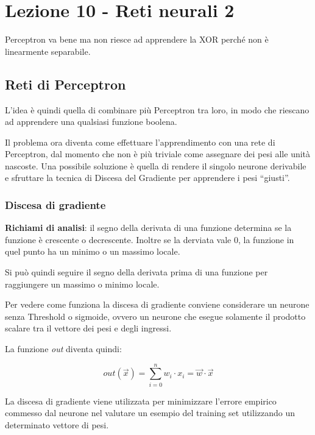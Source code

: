 \section{Lezione 10 - Reti neurali 2}\label{lezione-10---reti-neurali-2}

Perceptron va bene ma non riesce ad apprendere la XOR perché non è
linearmente separabile.

\subsection{Reti di Perceptron}\label{reti-di-perceptron}

L'idea è quindi quella di combinare più Perceptron tra loro, in modo che
riescano ad apprendere una qualsiasi funzione boolena.

Il problema ora diventa come effettuare l'apprendimento con una rete di
Perceptron, dal momento che non è più triviale come assegnare dei pesi
alle unità nascoste. Una possibile soluzione è quella di rendere il
singolo neurone derivabile e sfruttare la tecnica di Discesa del
Gradiente per apprendere i pesi ``giusti''.

\subsubsection{Discesa di gradiente}\label{discesa-di-gradiente}

\textbf{Richiami di analisi}: il segno della derivata di una funzione
determina se la funzione è crescente o decrescente. Inoltre se la
derviata vale 0, la funzione in quel punto ha un minimo o un massimo
locale.

Si può quindi seguire il segno della derivata prima di una funzione per
raggiungere un massimo o minimo locale.

Per vedere come funziona la discesa di gradiente conviene considerare un neurone senza Threshold o sigmoide, ovvero un neurone che esegue solamente il prodotto scalare tra il vettore dei pesi e degli ingressi.

La funzione \textit{out} diventa quindi:

$$
out(\vec{x}) = \sum\limits_{i=0}^n w_i \cdot x_i = \vec{w} \cdot \vec{x}
$$

La discesa di gradiente viene utilizzata per minimizzare l'errore empirico commesso dal neurone nel valutare un esempio del training set utilizzando un determinato vettore di pesi.

